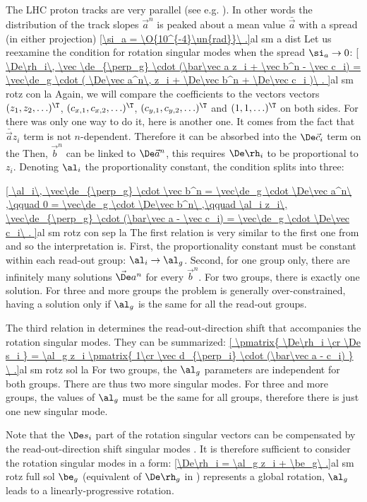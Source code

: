 The LHC proton tracks are very parallel (see e.g. ). In other words the distribution of the track slopes $\vec a^n$ is peaked about a mean value $\bar\vec a$ with a spread (in either projection)
\eqref{\si_a = \O{10^{-4}\un{rad}}\ .}{al sm a dist}
Let us reexamine the condition for rotation singular modes  when the spread $\si_a\to 0$:
\eqref{
	\De\rh_i\, \vec \de_{\perp_g} \cdot (\bar\vec a z_i + \vec b^n - \vec c_i) =
	\vec\de_g \cdot (
		\De\vec a^n\, z_i +
		\De\vec b^n +
		\De\vec c_i
	)\ .
}{al sm rotz con la}
Again, we will compare the coefficients to the vectors vectors $(z_1, z_2, \ldots)^\T$, $(c_{x,1}, c_{x,2}, \ldots)^\T$, $(c_{y,1}, c_{y,2},\ldots)^\T$ and $(1, 1, \ldots)^\T$ on both sides. For  there was only one way to do it, here is another one. It comes from the fact that $\bar\vec a z_i$ term is not $n$-dependent. Therefore it can be absorbed into the $\De\vec c_i$ term on the \rhs Then, $\vec b^n$ can be linked to $\De\vec a^n$, this requires $\De\rh_i$ to be proportional to $z_i$. Denoting $\al_i$ the proportionality constant, the condition splits into three:

\eqref{
	\al_i\, \vec\de_{\perp_g} \cdot \vec b^n = \vec\de_g \cdot \De\vec a^n\ ,\qquad
	0 = \vec\de_g \cdot \De\vec b^n\ ,\qquad
	\al_i z_i\, \vec\de_{\perp_g} \cdot (\bar\vec a - \vec c_i) = \vec\de_g \cdot \De\vec c_i\ .
}{al sm rotz con sep la}
The first relation is very similar to the first one from  and so the interpretation is. First, the proportionality constant must be constant within each read-out group: $\al_i\to \al_g$. Second, for one group only, there are infinitely many solutions $\vec\De a^n$ for every $\vec b^n$. For two groups, there is exactly one solution. For three and more groups the problem is generally over-constrained, having a solution only if $\al_g$ is the same for all the read-out groups.

The third relation in  determines the read-out-direction shift that accompanies the rotation singular modes. They can be summarized:
\eqref{
\pmatrix{
	\De\rh_i \cr
	\De s_i
	}
= \al_g z_i \pmatrix{
	1\cr
	\vec d_{\perp_i} \cdot (\bar\vec a - c_i)
}
\ .}{al sm rotz sol la}
For two groups, the $\al_g$ parameters are independent for both groups. There are thus two more singular modes. For three and more groups, the values of $\al_g$ must be the same for all groups, therefore there is just one new singular mode.

Note that the $\De s_i$ part of the rotation singular vectors  can be compensated by the read-out-direction shift singular modes . It is therefore sufficient to consider the rotation singular modes in a form:
\eqref{\De\rh_i = \al_g z_i + \be_g\ .}{al sm rotz full sol}
$\be_g$ (equivalent of $\De\rh_g$ in ) represents a global rotation, $\al_g$ leads to a linearly-progressive rotation.

